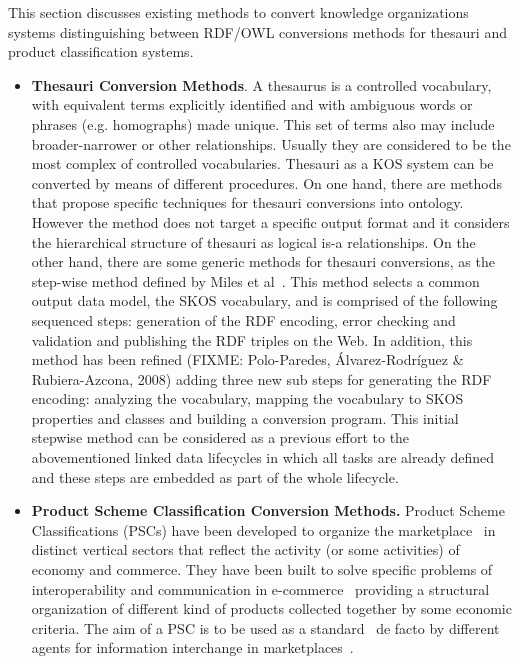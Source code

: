 This section discusses existing methods to convert knowledge organizations systems distinguishing between RDF/OWL 
conversions methods for thesauri and product classification systems.
\begin{itemize}
 \item \textbf{Thesauri Conversion Methods}. A thesaurus is a controlled vocabulary, with equivalent terms explicitly 
 identified and with ambiguous words or phrases (e.g. homographs) made unique. This set of terms also may include broader-narrower 
 or other relationships. Usually they are considered to be the most complex of controlled vocabularies. Thesauri as a KOS 
 system can be converted by means of different procedures. On one hand, there are methods~\cite{DBLP:conf/jcdl/Soergel05} that propose specific 
 techniques for thesauri conversions into ontology. However the method does not target a specific output format and it considers the 
 hierarchical structure of thesauri as logical is-a relationships. On the other hand, there are some generic methods 
 for thesauri conversions, as the step-wise method defined by Miles et al~\cite{DBLP:conf/esws/AssemMMS06}. This method selects a common output data model, the 
 SKOS vocabulary, and is comprised of the following sequenced steps: generation of the RDF encoding, error checking and validation 
 and publishing the RDF triples on the Web. In addition, this method has been refined (FIXME: Polo-Paredes, Álvarez-Rodríguez \& Rubiera-Azcona, 2008) 
 adding three new sub steps for generating the RDF encoding: analyzing the vocabulary, mapping the vocabulary to 
 SKOS properties and classes and building a conversion program. This initial stepwise method can be considered as 
 a previous effort to the abovementioned linked data lifecycles in which all tasks are already defined and these
 steps are embedded as part of the whole lifecycle.
 
 \item \textbf{Product Scheme Classification Conversion Methods.}  Product Scheme Classifications (PSCs) have been developed to 
 organize the marketplace~\cite{Leukel-automating} in distinct vertical sectors that reflect the 
 activity (or some activities) of economy and commerce. They have been built to solve specific problems of 
 interoperability and communication in e-commerce~\cite{Leukel-findings} providing a structural organization 
 of different kind of products collected together by some economic criteria. The aim of a PSC is to be used 
 as a standard~\cite{Leukel-standard} de facto by different agents for information interchange 
 in marketplaces~\cite{FenselOmel2001,FenselDing2001}.
 

\end{itemize}
